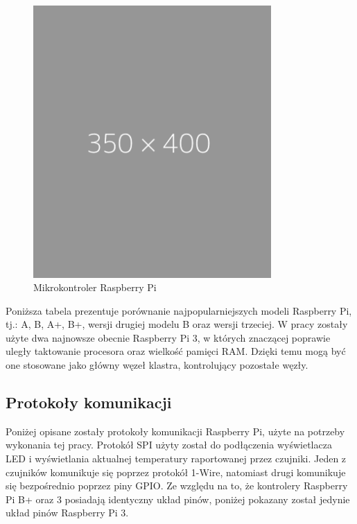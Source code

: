 \documentclass[12pt]{report}
\let\Oldsubsection\subsection
\renewcommand{\subsection}{\FloatBarrier\Oldsubsection}
\begin{document}
{\begin{figure}[h]
	\centering
	\includegraphics[width=0.81\textwidth]{images/placeholder.png}
	\caption{Mikrokontroler Raspberry Pi}
\end{figure}

\noindent Poniższa tabela prezentuje porównanie najpopularniejszych modeli Raspberry Pi, tj.: A, B, A+, B+, wersji drugiej modelu B oraz wersji trzeciej. W pracy zostały użyte dwa najnowsze obecnie Raspberry Pi 3, w których znaczącej poprawie uległy taktowanie procesora oraz wielkość pamięci RAM. Dzięki temu mogą być one stosowane jako główny węzeł klastra, kontrolujący pozostałe węzły.


\subsection{Protokoły komunikacji}
Poniżej opisane zostały protokoły komunikacji Raspberry Pi, użyte na potrzeby wykonania tej pracy. Protokół SPI użyty został do podłączenia wyświetlacza LED i wyświetlania aktualnej temperatury raportowanej przez czujniki. Jeden z czujników komunikuje się poprzez protokół 1-Wire, natomiast drugi komunikuje się bezpośrednio poprzez piny GPIO.
Ze względu na to, że kontrolery Raspberry Pi B+ oraz 3 posiadają identyczny układ pinów, poniżej pokazany został jedynie układ pinów Raspberry Pi 3.

}
\end{document}
